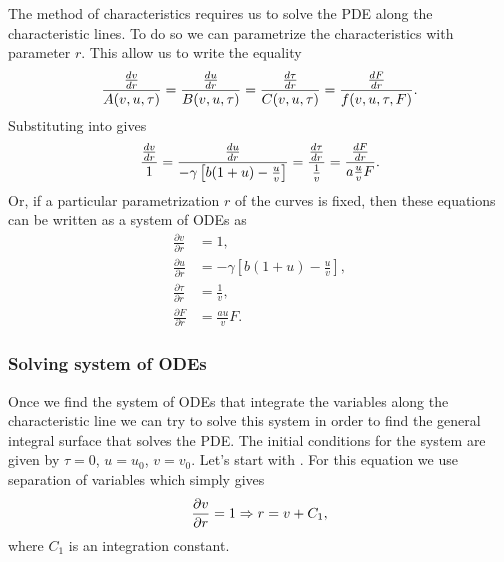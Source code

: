The method of characteristics requires us to solve the PDE along the
characteristic lines. To do so we can parametrize the characteristics with
parameter $r$. This allow us to write the equality
\begin{equation}
  {{dv \over dr} \over A(v, u, \tau)} =
  {{du \over dr} \over B(v, u, \tau)} =
  {{d\tau \over dr} \over C(v, u, \tau)} =
  {{dF \over dr} \over f(v, u, \tau, F)}.
  \label{eq_lagrange_charpit}
\end{equation}
Substituting  into  gives
\begin{equation}
  {{dv \over dr} \over 1} =
  {{du \over dr} \over - \gamma \left[ b (1 + u) - \frac{u}{v} \right]} =
  {{d\tau \over dr} \over {1 \over v}} =
  {{dF \over dr} \over a \frac{u}{v} F}.
\end{equation}
Or, if a particular parametrization $r$ of the curves is fixed, then these
equations can be written as a system of ODEs as
\begin{align}
  \frac{\partial v}{\partial r} &= 1,
  \label{eq_ODE_1}\\
  \frac{\partial u}{\partial r} &= - \gamma \left[ b (1 + u) - \frac{u}{v}
  \right],
  \label{eq_ODE_2}\\
  \frac{\partial \tau}{\partial r} &= \frac{1}{v},
  \label{eq_ODE_3}\\
  \frac{\partial F}{\partial r} &= \frac{a u}{v} F.
  \label{eq_ODE_4}
\end{align}

\subsubsection{Solving system of ODEs}

Once we find the system of ODEs that integrate the variables along the
characteristic line we can try to solve this system in order to find the general
integral surface that solves the PDE. The initial conditions for the system are
given by $\tau = 0$, $u = u_0$, $v = v_0$. Let's start with \eref[eq_ODE_1].
For this equation we use separation of variables which simply gives
\begin{equation}
  {\partial v \over \partial r} = 1 \Rightarrow
  r = v + C_1,
  \label{eq_ODE_sol_1}
\end{equation}
where $C_1$ is an integration constant.

